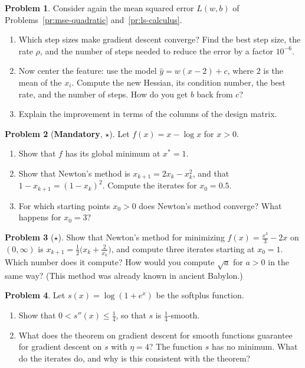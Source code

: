 \documentclass[11pt]{article}
\theoremstyle{definition}
\newtheorem{problem}{Problem}[section]
\newcommand{\mandatory}{\textcolor{red!70!black}{\textbf{Mandatory}}}
\begin{document}
\begin{problem}\label{pr:gd-least-squares}
    Consider again the mean squared error $L(w, b)$ of Problems~\ref{pr:mse-quadratic} and~\ref{pr:ls-calculus}.
    \begin{enumerate}[label=(\alph*)]
        \item Which step sizes make gradient descent converge? Find the best step size, the rate $\rho$, and the number of steps needed to reduce the error by a factor $10^{-6}$.
        \item Now center the feature: use the model $\hat y = w(x - 2) + c$, where $2$ is the mean of the $x_i$. Compute the new Hessian, its condition number, the best rate, and the number of steps. How do you get $b$ back from $c$?
        \item Explain the improvement in terms of the columns of the design matrix.
    \end{enumerate}
\end{problem}

\begin{problem}[\mandatory, $\star$]\label{pr:newton-log}
    Let $f(x) = x - \log x$ for $x > 0$.
    \begin{enumerate}[label=(\alph*)]
        \item Show that $f$ has its global minimum at $x^* = 1$.
        \item Show that Newton's method is $x_{k+1} = 2x_k - x_k^2$, and that $1 - x_{k+1} = (1 - x_k)^2$. Compute the iterates for $x_0 = 0.5$.
        \item For which starting points $x_0 > 0$ does Newton's method converge? What happens for $x_0 = 3$?
    \end{enumerate}
\end{problem}

\begin{problem}[$\star$]\label{pr:babylonian}
    Show that Newton's method for minimizing $f(x) = \frac{x^3}{3} - 2x$ on $(0, \infty)$ is $x_{k+1} = \frac{1}{2}\big(x_k + \frac{2}{x_k}\big)$, and compute three iterates starting at $x_0 = 1$. Which number does it compute? How would you compute $\sqrt{a}$ for $a > 0$ in the same way? (This method was already known in ancient Babylon.)
\end{problem}

\begin{problem}\label{pr:smooth-descent}
    Let $s(x) = \log(1 + e^x)$ be the softplus function.
    \begin{enumerate}[label=(\alph*)]
        \item Show that $0 < s''(x) \leq \frac{1}{4}$, so that $s$ is $\frac{1}{4}$-smooth.
        \item What does the theorem on gradient descent for smooth functions guarantee for gradient descent on $s$ with $\eta = 4$? The function $s$ has no minimum. What do the iterates do, and why is this consistent with the theorem?
    \end{enumerate}
\end{problem}
\end{document}
